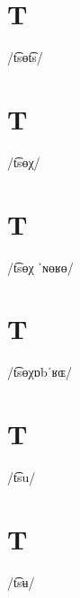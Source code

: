 \documentclass[10pt,a4paper,twoside]{book}
\begin{document}
\section*{T}

\begin{multicols}{3}
 {/t͡sɵt͡s/} {}
\end{multicols}

\section*{T}

\begin{multicols}{3}
 {/t͡sɵχ/} {}
\end{multicols}

\section*{T}

\begin{multicols}{3}
 {/t͡sɵχ ˈɴɵʁɵ/} {}
\end{multicols}

\section*{T}

\begin{multicols}{3}
 {/t͡sɵχɒbˈʁɶ/} {}
\end{multicols}

\section*{T}

\begin{multicols}{3}
 {/t͡su/} {}
\end{multicols}

\section*{T}

\begin{multicols}{3}
 {/t͡sʉ/} {}
\end{multicols}
\end{document}
